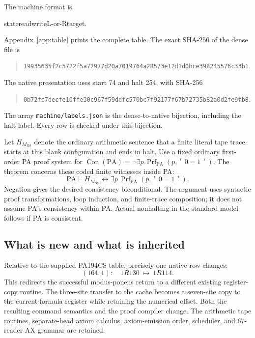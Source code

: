 \documentclass[11pt,letterpaper]{article}
\newcommand{\PA}{\mathrm{PA}}
\newcommand{\Con}{\operatorname{Con}}
\newcommand{\Prf}{\operatorname{Prf}}
\newcommand{\file}[1]{\texttt{\nolinkurl{#1}}}
\newcommand{\NS}{M_{\mathrm{NS}}}
\begin{document}
The machine format is
\begin{center}\ttfamily state\quad read\quad write\quad L-or-R\quad target.\end{center}
Appendix~\ref{app:table} prints the complete table.
The exact SHA-256 of the dense file is
\begin{quote}\small
\nolinkurl{19935635f2c5722f5a72977d20a7019764a28573e12d1d0bce398245576c33b1}.
\end{quote}
The native presentation uses start 74 and halt 254, with SHA-256
\begin{quote}\small
\nolinkurl{0b72fc7decfe10ffe30c967f59ddfc570bc7f92177f67b72735b82a0d2fe9fb8}.
\end{quote}
The array \file{machine/labels.json} is the dense-to-native bijection,
including the halt label. Every row is checked under this bijection.

Let $H_{\NS}$ denote the ordinary arithmetic sentence that a finite
literal tape trace starts at this blank configuration and ends in halt.
Use a fixed ordinary first-order PA proof system for
$\Con(\PA)=\neg\exists p\,\Prf_{\PA}(p,\ulcorner0=1\urcorner)$.
The theorem concerns these coded finite witnesses inside PA:
\begin{equation}\label{eq:main-calibration}
 \PA\vdash H_{\NS}\leftrightarrow
              \exists p\,\Prf_{\PA}(p,\ulcorner0=1\urcorner).
\end{equation}
Negation gives the desired consistency biconditional. The argument uses
syntactic proof transformations, loop induction, and finite-trace
composition; it does not assume PA's consistency within PA.
Actual nonhalting in the standard model follows if PA is consistent.

\subsection{What is new and what is inherited}

Relative to the supplied PA194CS table, precisely one native row changes:
\begin{equation}\label{eq:native-edit}
          (164,1):\quad 1R130\ \longmapsto\ 1R114.
\end{equation}
This redirects the successful modus-ponens return to a different existing
register-copy routine. The three-site transfer to the cache becomes a
seven-site copy to the current-formula register while retaining the
numerical offset. Both the resulting command semantics and the proof
compiler change. The arithmetic tape routines, separate-head axiom
calculus, axiom-emission order, scheduler, and 67-reader AX grammar are
retained.
\end{document}
